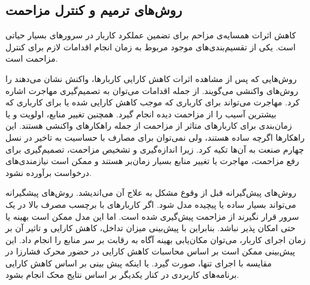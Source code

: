 \subsection{روش‌های ترمیم و کنترل مزاحمت}

کاهش اثرات همسایه‌ی مزاحم برای تضمین عملکرد کاربار در سرورهای  بسیار حیاتی است. یکی از تقسیم‌بندی‌های موجود مربوط به زمان انجام اقدامات لازم برای کنترل مزاحمت است. 

روش‌هایی که پس از مشاهده اثرات کاهش کارایی کاربارها، واکنش نشان می‌دهند را روش‌های واکنشی می‌گویند. از جمله اقدامات می‌توان به تصمیم‌گیری مهاجرت اشاره کرد. مهاجرت می‌تواند برای کارباری که موجب کاهش کارایی شده یا برای کارباری که بیشترین آسیب را از مزاحمت دیده انجام گیرد. همچنین تغییر منابع، اولویت و یا زمان‌بندی برای کاربارهای متاثر از مزاحمت از جمله راهکارهای واکنشی هستند. این راهکارها اگرچه ساده هستند، ولی نمی‌توان برای مصارف با حساسیت به تاخیر در نسل چهارم صنعت به آن‌ها تکیه کرد. زیرا اندازه‌گیری و تشخیص مزاحمت، تصمیم‌گیری برای رفع مزاحمت، مهاجرت یا تغییر منابع بسیار زمان‌بر هستند و ممکن است نیازمندی‌های درخواست برآورده نشود.

روش‌های پیش‌گیرانه قبل از وقوع مشکل به علاج آن می‌اندیشد. روش‌های پیشگیرانه می‌تواند بسیار ساده یا پیچیده مدل شود. اگر کاربارهای با برچسب مصرف بالا در یک سرور  قرار نگیرند از مزاحمت پیش‌گیری شده است. اما این مدل ممکن است بهینه یا حتی امکان پذیر نباشد. بنابراین با پیش‌بینی میزان تداخل، کاهش کارایی و تاثیر آن بر زمان اجرای کاربار، می‌توان مکان‌یابی بهینه آگاه به رقابت بر سر منابع را انجام داد. این پیش‌بینی ممکن است بر اساس محاسبات کاهش کارایی در حضور محرک فشارزا در مقایسه با اجرای تنها، صورت گیرد. یا اینکه پیش بینی بر اساس کاهش کارایی برنامه‌های کاربردی در کنار یکدیگر بر اساس نتایج محک انجام بشود.

